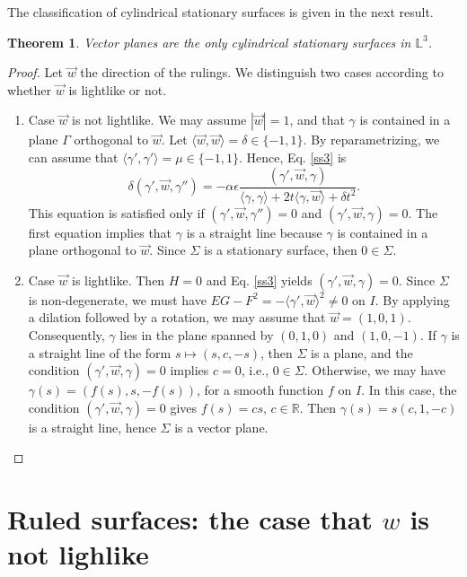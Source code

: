 \documentclass[a4paper,12pt]{amsart}
\newtheorem{theorem}{Theorem}[section]
\theoremstyle{definition}
\def\r{\mathbb R}
\def\l{\mathbb L}
\begin{document}
 The classification of cylindrical stationary surfaces is given in the next result.


\begin{theorem} \label{cy}
Vector planes are the only cylindrical stationary surfaces in $\l^3$.
\end{theorem}
\begin{proof}
  Let $\vec{w}$ the direction of the rulings.   We distinguish two cases according to whether $\vec{w}$ is lightlike or not.

\begin{enumerate}
\item Case $\vec{w}$ is not lightlike. We may assume   $| \vec{w} |= 1$, and that $\gamma$ is contained in a plane $\Gamma$ orthogonal to $\vec{w}$. Let   $\langle \vec{w}, \vec{w}\rangle=\delta \in \{-1,1 \}$. By reparametrizing, we can assume that $\langle \gamma',\gamma' \rangle =\mu \in \{-1,1 \}$. Hence, Eq. \eqref{ss3} is
$$
\delta (\gamma',\vec{w}, \gamma'')=-\alpha\epsilon \frac{(\gamma',\vec{w},\gamma)}{\langle \gamma, \gamma\rangle+2t\langle \gamma, \vec{w}\rangle+\delta t^2}.
$$
This equation is satisfied only if $(\gamma',\vec{w}, \gamma'')=0$ and $(\gamma',\vec{w},\gamma)=0$. The first equation implies that $\gamma$ is a straight line because $\gamma$ is contained in a plane orthogonal to $\vec{w}$.   Since $\Sigma$ is a stationary surface, then $0\in\Sigma$. 

\item Case $\vec{w}$ is   lightlike.  Then $H=0$ and Eq.  \eqref{ss3} yields $(\gamma',\vec{w},\gamma)=0$. Since $\Sigma$ is non-degenerate, we must have  $EG-F^2=-\langle\gamma',\vec{w}\rangle^2\neq 0$ on $I$. By applying a dilation followed by a rotation, we may assume  that $\vec{w}=(1,0,1)$. Consequently, $\gamma$ lies in the plane spanned by $(0,1,0)$ and $(1,0,-1)$. If $\gamma$ is a straight line 
of the form $s\mapsto (s,c,-s)$, then $\Sigma$ is a plane, and the condition $(\gamma',\vec{w},\gamma)=0$ implies $c=0$, i.e., $0 \in \Sigma$. Otherwise, we may have $\gamma(s)=(f(s),s,-f(s))$, for a smooth function $f$ on $I$. In this case, the condition $(\gamma',\vec{w},\gamma)=0$ gives $f(s)=cs$, $c\in \r$. Then $\gamma(s)=s(c,1,-c)$ is a straight line, hence $\Sigma$ is a vector plane.
\end{enumerate}
\end{proof}


\section{Ruled surfaces: the case that $w$ is not lighlike}\label{s4}
\end{document}
